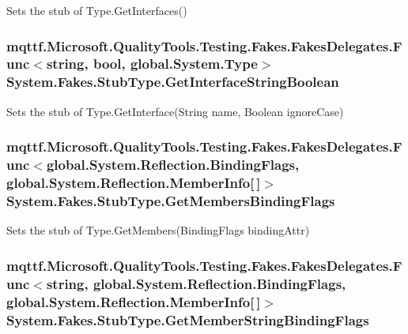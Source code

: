 Sets the stub of Type.\-Get\-Interfaces()

\hypertarget{class_system_1_1_fakes_1_1_stub_type_aa4ba16e9881eda9363a9dc229ae9cbce}{
\subsubsection[{Get\-Interface\-String\-Boolean}]{\setlength{\rightskip}{0pt plus 5cm}mqttf.\-Microsoft.\-Quality\-Tools.\-Testing.\-Fakes.\-Fakes\-Delegates.\-Func$<$string, bool, global.\-System.\-Type$>$ System.\-Fakes.\-Stub\-Type.\-Get\-Interface\-String\-Boolean}}\label{class_system_1_1_fakes_1_1_stub_type_aa4ba16e9881eda9363a9dc229ae9cbce}


Sets the stub of Type.\-Get\-Interface(\-String name, Boolean ignore\-Case)

\hypertarget{class_system_1_1_fakes_1_1_stub_type_a5274e83ffe727ac5b88c7f5b6a9be5bd}{
\subsubsection[{Get\-Members\-Binding\-Flags}]{\setlength{\rightskip}{0pt plus 5cm}mqttf.\-Microsoft.\-Quality\-Tools.\-Testing.\-Fakes.\-Fakes\-Delegates.\-Func$<$global.\-System.\-Reflection.\-Binding\-Flags, global.\-System.\-Reflection.\-Member\-Info\mbox{[}$\,$\mbox{]}$>$ System.\-Fakes.\-Stub\-Type.\-Get\-Members\-Binding\-Flags}}\label{class_system_1_1_fakes_1_1_stub_type_a5274e83ffe727ac5b88c7f5b6a9be5bd}


Sets the stub of Type.\-Get\-Members(\-Binding\-Flags binding\-Attr)

\hypertarget{class_system_1_1_fakes_1_1_stub_type_ad45161f0d2d5ed9dd3598b6ae1940263}{
\subsubsection[{Get\-Member\-String\-Binding\-Flags}]{\setlength{\rightskip}{0pt plus 5cm}mqttf.\-Microsoft.\-Quality\-Tools.\-Testing.\-Fakes.\-Fakes\-Delegates.\-Func$<$string, global.\-System.\-Reflection.\-Binding\-Flags, global.\-System.\-Reflection.\-Member\-Info\mbox{[}$\,$\mbox{]}$>$ System.\-Fakes.\-Stub\-Type.\-Get\-Member\-String\-Binding\-Flags}}\label{class_system_1_1_fakes_1_1_stub_type_ad45161f0d2d5ed9dd3598b6ae1940263}


